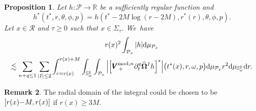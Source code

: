 \documentclass[10pt]{amsart}
\theoremstyle{plain}
\newtheorem{proposition}{Proposition}[section]
\theoremstyle{definition}
\newtheorem{remark}[proposition]{Remark}
\newcommand\R{{\mathbb{R}}}
\newcommand\dr{{\mathrm{d}}}
\begin{document}
\begin{proposition}\label{ProdecaypointBoundedregion}
Let $h : \mathcal{P} \to \R$ be a sufficiently regular function and
\[
h^*(t^*,r,\theta,\phi,p)=h(t^*-2M\log(r-2M),r^*(r),\theta,\phi,p).
\]
Let $x \in \mathcal{R} $ and $\tau \geq 0$ such that $x \in \Sigma_\tau$. We~have
\begin{multline*}
r(x)^2 \int_{\mathcal{P}_x} |h| \dr \mu_{\mathcal{P}_x} \\
\lesssim \sum_{n+q \leq 1} \sum_{|I| \leq 2} \int_{r= r(x)}^{ r(x)+M } \int_{\mathbb{S}^2_\omega} \int_{\mathcal{P}_x} \Big| \Bigl[ \pmb{V}_{\, +}^{ \mathrm{mod},n} \partial_t^q \widehat{\mathbf{\Omega}}^I h \Bigr]^* \Big| \bigl(t^*(x),r,\omega,p \bigr) \dr \mu_{\mathcal{P}_x} r^2 \dr \mu_{\mathbb{S}^2_\omega} \dr r.
\end{multline*}
\end{proposition}
\begin{remark}\label{Rkdomain}
The radial domain of the integral could be chosen to be \hbox{$[r(x)\mkern-4mu-\mkern-4mu M,r(x)]$} if $r(x) \geq 3M$.
\end{remark}
\end{document}
